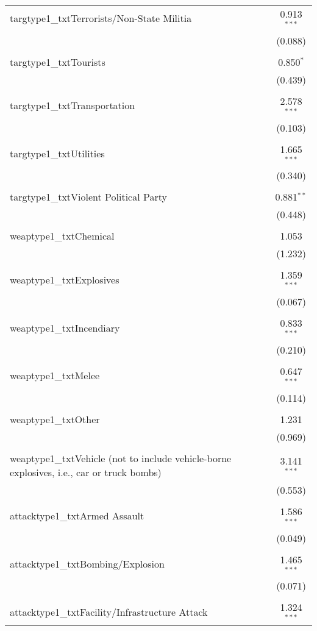 \begin{table}[!htbp]
\begin{tabular}{@{\extracolsep{0.1pt}}lc}
 targtype1\_txtTerrorists/Non-State Militia & 0.913$^{***}$ \\ 
  & (0.088) \\ 
  & \\ 
 targtype1\_txtTourists & 0.850$^{*}$ \\ 
  & (0.439) \\ 
  & \\ 
 targtype1\_txtTransportation & 2.578$^{***}$ \\ 
  & (0.103) \\ 
  & \\ 
 targtype1\_txtUtilities & 1.665$^{***}$ \\ 
  & (0.340) \\ 
  & \\ 
 targtype1\_txtViolent Political Party & 0.881$^{**}$ \\ 
  & (0.448) \\ 
  & \\ 
 weaptype1\_txtChemical & 1.053 \\ 
  & (1.232) \\ 
  & \\ 
 weaptype1\_txtExplosives & 1.359$^{***}$ \\ 
  & (0.067) \\ 
  & \\ 
 weaptype1\_txtIncendiary & 0.833$^{***}$ \\ 
  & (0.210) \\ 
  & \\ 
 weaptype1\_txtMelee & 0.647$^{***}$ \\ 
  & (0.114) \\ 
  & \\ 
 weaptype1\_txtOther & 1.231 \\ 
  & (0.969) \\ 
  & \\ 
 weaptype1\_txtVehicle (not to include vehicle-borne explosives, i.e., car or truck bombs) & 3.141$^{***}$ \\ 
  & (0.553) \\ 
  & \\ 
 attacktype1\_txtArmed Assault & 1.586$^{***}$ \\ 
  & (0.049) \\ 
  & \\ 
 attacktype1\_txtBombing/Explosion & 1.465$^{***}$ \\ 
  & (0.071) \\ 
  & \\ 
 attacktype1\_txtFacility/Infrastructure Attack & 1.324$^{***}$ \\ 

\end{tabular}
\end{table}
